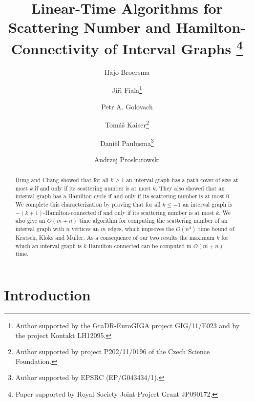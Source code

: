 \documentclass{llncs}
\begin{document}
\title{Linear-Time Algorithms for Scattering Number and Hamilton-Connectivity of Interval Graphs
\thanks{Paper supported by Royal Society Joint Project Grant JP090172.}}


\author
{Hajo Broersma 
\and 
Ji\v{r}\'{\i} Fiala\thanks{Author supported by the GraDR-EuroGIGA project GIG/11/E023 and by the project Kontakt LH12095.} 
\and
Petr A. Golovach  
\and 
Tom\'a\v{s} Kaiser\thanks{Author supported by project P202/11/0196 of the Czech Science Foundation.}  
\and 
Dani\"el Paulusma\thanks{Author supported by EPSRC (EP/G043434/1).}  
\and Andrzej Proskurowski
}


\maketitle


\begin{abstract}\noindent
Hung and Chang showed that for all $k\geq 1$ an interval graph has a path cover of size at most $k$ if and only if its scattering number is at 
most $k$. They also showed that an interval graph has a Hamilton cycle if and only if its scattering number is at most $0$.
We complete this characterization by proving that for all $k\leq -1$ an interval graph is $-(k+1)$-Hamilton-connected if and only if its scattering number is at most $k$. 
We also give an $O(m+n)$ time algorithm for computing the scattering number of an interval graph with $n$ vertices an $m$ edges, which improves the $O(n^4)$ time bound of Kratsch, Kloks and M\"uller.  
As a consequence of our two results the maximum $k$ for  which an interval graph is $k$-Hamilton-connected can be computed in $O(m+n)$ time. 
\end{abstract}

\section{Introduction}\label{s:intro}
\end{document}
